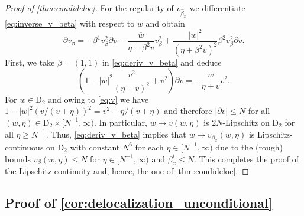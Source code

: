 \documentclass[11pt]{article}
\newcommand{\abs}[1]{\left| #1 \right|}
\theoremstyle{plain}
\theoremstyle{remark}
\numberwithin{equation}{section}
\newcommand*\barr[1]{\overline{#1}}
\newcommand*\ubarr[1]{{\widehat{#1}}}
\begin{document}
\begin{proof}[Proof of \cref{thm:condideloc}]
		For the regularity of $v_{\ubarr{\beta}_x}$ we differentiate \cref{eq:inverse_v_beta} with respect to $w$ and obtain
		\begin{equation}\label{eq:deriv_v_beta}
			\partial v_{\beta} = - \beta^1 v_{\beta}^2 \partial v - \frac{\barr{w}}{\eta + \beta^2 v} v_{\beta}^2 + \frac{\abs{w}^2}{(\eta + \beta^2 v)^2}  \beta^{2} v_{\beta}^2 \partial v.
		\end{equation}
        First, we take $\beta = (1,1)$ in \cref{eq:deriv_v_beta} and deduce 
		\begin{equation*}
			\left( 1  - \abs{w}^2\frac{ v^2 }{(\eta+ v)^2} + v^2 \right) \partial v = -\frac{\barr{w}}{\eta + v} v^2.
		\end{equation*}
		For $w\in \mathrm{D}_2$  and owing to \cref{eq:v} we have $1 - \abs{w}^2\left( v/(v+ \eta)\right)^2 = v^2 + \eta/(v+\eta) $ and therefore
$\abs{ \partial v } \le N$ for all $(w, \eta) \in \mathrm{D}_2\times [N^{-1}, \infty)$. In particular, $w \mapsto  v(w,\eta)$ is $2N$-Lipschitz on $\mathrm{D}_2$ for all $\eta \geq N^{-1}$. Thus, \cref{eq:deriv_v_beta} implies that $w \mapsto v_{\beta_x}(w,\eta)$ is Lipschitz-continuous on $\mathrm{D}_2$ with constant $N^6$ for each $\eta \in [N^{-1},\infty)$ due to the (rough) bounds $v_{\beta}(w,\eta) \leq N$ for $\eta \in [N^{-1},\infty)$ and $\beta_x^i \leq N$. This completes the proof of the Lipschitz-continuity and, hence, the one of 
		\cref{thm:condideloc}. 
	\end{proof}
	
	\subsection{Proof of \cref{cor:delocalization_unconditional}} \label{sec:proof_cor_deloc_ER_graph} 
	
\end{document}
